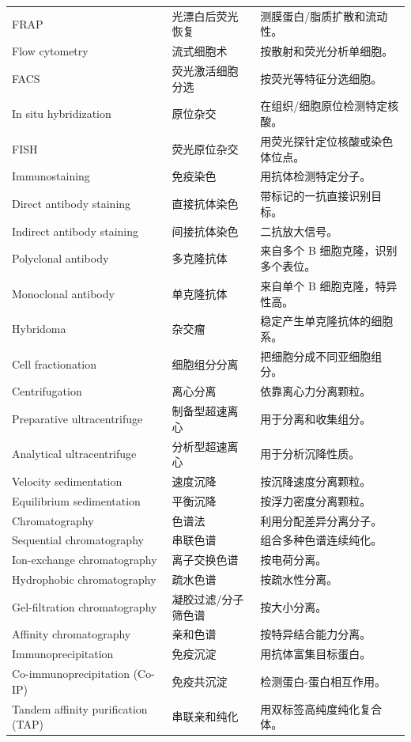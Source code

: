 \documentclass[11pt,fontset=none]{ctexart}
\begin{document}
\begin{longtable}{L{3.2cm} L{3.8cm} L{8.5cm}}
FRAP & 光漂白后荧光恢复 & 测膜蛋白/脂质扩散和流动性。 \\
Flow cytometry & 流式细胞术 & 按散射和荧光分析单细胞。 \\
FACS & 荧光激活细胞分选 & 按荧光等特征分选细胞。 \\
In situ hybridization & 原位杂交 & 在组织/细胞原位检测特定核酸。 \\
FISH & 荧光原位杂交 & 用荧光探针定位核酸或染色体位点。 \\
Immunostaining & 免疫染色 & 用抗体检测特定分子。 \\
Direct antibody staining & 直接抗体染色 & 带标记的一抗直接识别目标。 \\
Indirect antibody staining & 间接抗体染色 & 二抗放大信号。 \\
Polyclonal antibody & 多克隆抗体 & 来自多个 B 细胞克隆，识别多个表位。 \\
Monoclonal antibody & 单克隆抗体 & 来自单个 B 细胞克隆，特异性高。 \\
Hybridoma & 杂交瘤 & 稳定产生单克隆抗体的细胞系。 \\
Cell fractionation & 细胞组分分离 & 把细胞分成不同亚细胞组分。 \\
Centrifugation & 离心分离 & 依靠离心力分离颗粒。 \\
Preparative ultracentrifuge & 制备型超速离心 & 用于分离和收集组分。 \\
Analytical ultracentrifuge & 分析型超速离心 & 用于分析沉降性质。 \\
Velocity sedimentation & 速度沉降 & 按沉降速度分离颗粒。 \\
Equilibrium sedimentation & 平衡沉降 & 按浮力密度分离颗粒。 \\
Chromatography & 色谱法 & 利用分配差异分离分子。 \\
Sequential chromatography & 串联色谱 & 组合多种色谱连续纯化。 \\
Ion-exchange chromatography & 离子交换色谱 & 按电荷分离。 \\
Hydrophobic chromatography & 疏水色谱 & 按疏水性分离。 \\
Gel-filtration chromatography & 凝胶过滤/分子筛色谱 & 按大小分离。 \\
Affinity chromatography & 亲和色谱 & 按特异结合能力分离。 \\
Immunoprecipitation & 免疫沉淀 & 用抗体富集目标蛋白。 \\
Co-immunoprecipitation (Co-IP) & 免疫共沉淀 & 检测蛋白-蛋白相互作用。 \\
Tandem affinity purification (TAP) & 串联亲和纯化 & 用双标签高纯度纯化复合体。 \\

\end{longtable}
\end{document}
